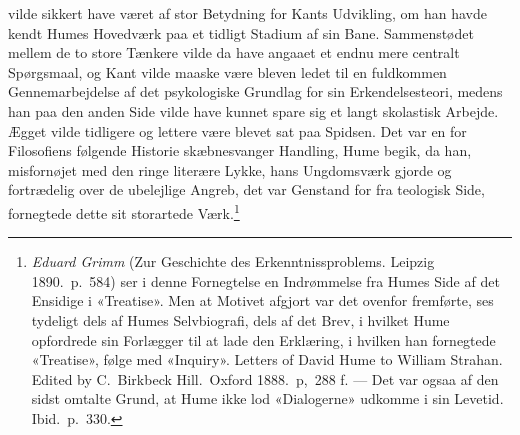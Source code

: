 \documentclass[12pt,a4paper]{article}
\begin{document}
vilde sikkert have været af stor Betydning for Kants Udvikling, om han
havde kendt Humes Hovedværk paa et tidligt Stadium af sin Bane.
Sammenstødet mellem de to store Tænkere vilde da have angaaet et endnu
mere centralt Spørgsmaal, og Kant vilde maaske være bleven ledet til en
fuldkommen Gennemarbejdelse af det psykologiske Grundlag for sin
Erkendelsesteori, medens han paa den anden Side vilde have kunnet spare
sig et langt skolastisk Arbejde. Ægget vilde tidligere og lettere være
blevet sat paa Spidsen. Det var en for Filosofiens følgende Historie
skæbnesvanger Handling, Hume begik, da han, misfornøjet med den ringe
literære Lykke, hans Ungdomsværk gjorde og fortrædelig over de ubelejlige
Angreb, det var Genstand for fra teologisk Side, fornegtede dette sit
storartede Værk.\footnote{\emph{Eduard Grimm} (Zur Geschichte des
Erkenntnissproblems. Leipzig 1890.\ p.\ 584) ser i denne Fornegtelse en
Indrømmelse fra Humes Side af det Ensidige i «Treatise». Men at Motivet
afgjort var det ovenfor fremførte, ses tydeligt dels af Humes
Selvbiografi, dels af det Brev, i hvilket Hume opfordrede sin Forlægger
til at lade den Erklæring, i hvilken han fornegtede «Treatise», følge med
«Inquiry». Letters of David Hume to William Strahan. Edited by
C.\ Birkbeck Hill.\ Oxford 1888.\ p,\ 288 f. --- Det var ogsaa af den
sidst omtalte Grund, at Hume ikke lod «Dialogerne» udkomme i sin Levetid.
Ibid.\ p.\ 330.}
\end{document}

